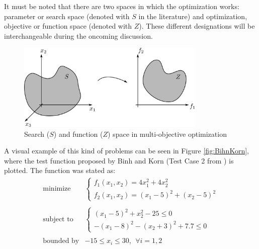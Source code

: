     \newpage
    
    It must be noted that there are two spaces in which the optimization works: parameter or search space (denoted with $S$ in the literature) and optimization, objective or function space (denoted with $Z$). These different designations will be interchangeable during the oncoming discussion. 
    
    \begin{figure}[h!]
        \centering
        \includegraphics[width=0.8\textwidth]{Figures/2/searchSpaceFunction.png}
        \caption{Search ($S$) and function ($Z$) space in multi-objective optimization}
        \label{fig:twoSpaces}
    \end{figure}    
    
    A visual example of this kind of problems can be seen in Figure \ref{fig:BihnKorn}, where the test function proposed by Binh and Korn (Test Case 2 from \cite{binh1997mobes}) is plotted. The function was stated as:
    \begin{equation}
        \begin{array}{cl}
            \textrm{minimize} & 
            \left\{ \begin{array}{l}
                f_1(x_1,x_2) = 4x_1^2 + 4x_2^2\\
                f_2(x_1,x_2) = (x_1-5)^2+(x_2-5)^2
            \end{array} \right. \\
            & \\
            \textrm{subject to} &  
            \left\{ \begin{array}{l}
                (x_1-5)^2+x_2^2-25 \leq 0\\
                -(x_1-8)^2-(x_2+3)^2 + 7.7 \leq 0
            \end{array} \right. \\
            & \\
            \textrm{bounded by} & -15 \leq x_i \leq 30, \ \ \forall i = 1,2
        \end{array}
        \label{eq:BihnKorn}
    \end{equation}
    
